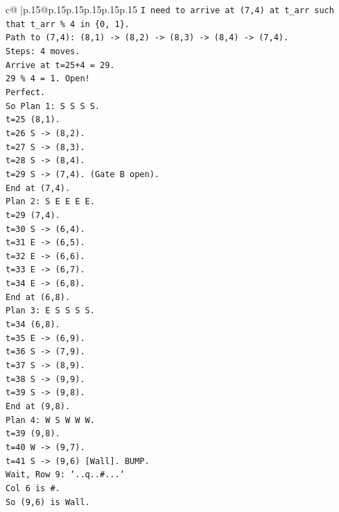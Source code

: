 \documentclass{article}
\begin{document}
{\begin{supertabular}{c@{$\;$}|p{.15\linewidth}@{}p{.15\linewidth}p{.15\linewidth}p{.15\linewidth}p{.15\linewidth}p{.15\linewidth}}
{{{\texttt{I need to arrive at (7,4) at t\_arr such that t\_arr \% 4 in \{0, 1\}.} \\
\texttt{Path to (7,4): (8,1) {-}> (8,2) {-}> (8,3) {-}> (8,4) {-}> (7,4).} \\
\texttt{Steps: 4 moves.} \\
\texttt{Arrive at t=25+4 = 29.} \\
\texttt{29 \% 4 = 1. Open!} \\
\texttt{Perfect.} \\
\texttt{So Plan 1: S S S S.} \\
\texttt{t=25 (8,1).} \\
\texttt{t=26 S {-}> (8,2).} \\
\texttt{t=27 S {-}> (8,3).} \\
\texttt{t=28 S {-}> (8,4).} \\
\texttt{t=29 S {-}> (7,4). (Gate B open).} \\
\texttt{End at (7,4).} \\
\texttt{Plan 2: S E E E E.} \\
\texttt{t=29 (7,4).} \\
\texttt{t=30 S {-}> (6,4).} \\
\texttt{t=31 E {-}> (6,5).} \\
\texttt{t=32 E {-}> (6,6).} \\
\texttt{t=33 E {-}> (6,7).} \\
\texttt{t=34 E {-}> (6,8).} \\
\texttt{End at (6,8).} \\
\texttt{Plan 3: E S S S S.} \\
\texttt{t=34 (6,8).} \\
\texttt{t=35 E {-}> (6,9).} \\
\texttt{t=36 S {-}> (7,9).} \\
\texttt{t=37 S {-}> (8,9).} \\
\texttt{t=38 S {-}> (9,9).} \\
\texttt{t=39 S {-}> (9,8).} \\
\texttt{End at (9,8).} \\
\texttt{Plan 4: W S W W W.} \\
\texttt{t=39 (9,8).} \\
\texttt{t=40 W {-}> (9,7).} \\
\texttt{t=41 S {-}> (9,6) {[}Wall{]}. BUMP.} \\
\texttt{Wait, Row 9: `..q..\#...`} \\
\texttt{Col 6 is \#.} \\
\texttt{So (9,6) is Wall.} \\
}}}
\end{supertabular}}
\end{document}
